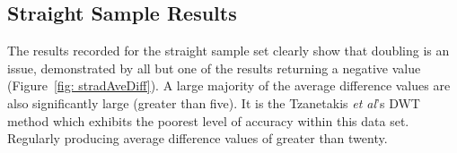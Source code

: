 \documentclass[a4paper, 11pt]{article}
\begin{document}




\subsection{Straight Sample Results}
The results recorded for the straight sample set clearly show that doubling is an issue, demonstrated by all but one of the results returning a negative value (Figure~\ref{fig: stradAveDiff}). A large majority of the average difference values are also significantly large (greater than five). It is the Tzanetakis \textit{et al}'s \cite{tzane1} DWT method which exhibits the poorest level of accuracy within this data set. Regularly producing average difference values of greater than twenty.\par
\end{document}
